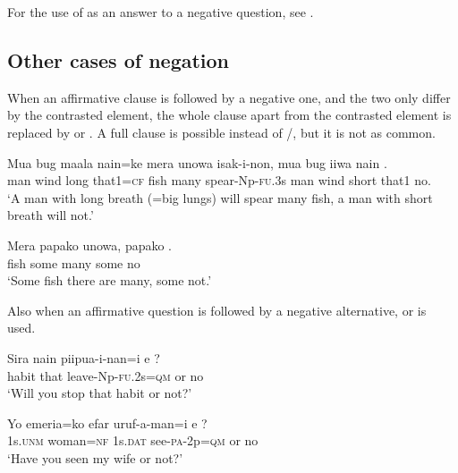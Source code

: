 For the use of  as an answer to a negative question, see .

\subsection{Other cases of negation} \label{sec:6.2.4}

When an affirmative clause is followed by a negative one, and the two only differ by the contrasted element, the whole clause apart from the contrasted element is replaced by  or . A full clause is possible instead of /, but it is not as common.

\ea%
\label{ex:6:x1119}
\gll Mua  bug  maala  nain=ke  mera  unowa  isak-i-non, mua  bug  iiwa  nain  .\\
man  wind  long  that1=\textsc{cf}  fish  many  spear-Np-\textsc{fu}.3s man  wind  short  that1  no.\\
\glt `A man with long breath (=big lungs) will spear many fish, a man with short breath will not.'
\z

\ea%
\label{ex:6:x1120}
\gll Mera  papako  unowa,  papako  . \\
fish  some  many  some  no\\
\glt `Some fish there are many, some not.'
\z

Also when an affirmative question is followed by a negative alternative,  or  is used. 

\ea%
\label{ex:6:x1121}
\gll Sira  nain  piipua-i-nan=i  e  ? \\
habit  that  leave-Np-\textsc{fu}.2s=\textsc{qm}  or  no\\
\glt `Will you stop that habit or not?'
\z

\ea%
\label{ex:6:x1122}
\gll Yo  emeria=ko  efar  uruf-a-man=i  e  ? \\
1s.\textsc{unm}  woman=\textsc{nf}  1s.\textsc{dat}  see-\textsc{pa}-2p=\textsc{qm}  or  no\\
\glt `Have you seen my wife or not?'
\z


